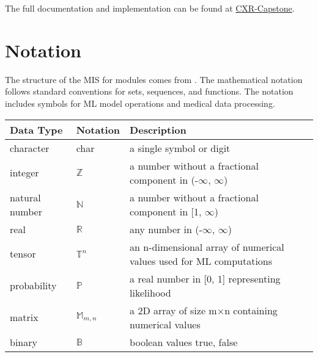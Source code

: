 \documentclass[12pt, titlepage]{article}
\begin{document}
The full documentation and implementation can be found at \href{https://github.com/RezaJodeiri/CXR-Capstone}{CXR-Capstone}.

\section{Notation}
The structure of the MIS for modules comes from \citet{HoffmanAndStrooper1995}. The mathematical notation follows standard conventions for sets, sequences, and functions. The notation includes symbols for ML model operations and medical data processing.
\begin{center}
    \renewcommand{\arraystretch}{1.2}
    \noindent 
    \begin{tabular}{l l p{7.5cm}} 
    \toprule 
    \textbf{Data Type} & \textbf{Notation} & \textbf{Description}\\ 
    \midrule
    character & char & a single symbol or digit\\
    integer & $\mathbb{Z}$ & a number without a fractional component in (-$\infty$, $\infty$)\\
    natural number & $\mathbb{N}$ & a number without a fractional component in [1, $\infty$)\\
    real & $\mathbb{R}$ & any number in (-$\infty$, $\infty$)\\
    tensor & $\mathbb{T}^{n}$ & an n-dimensional array of numerical values used for ML computations\\
    probability & $\mathbb{P}$ & a real number in [0, 1] representing likelihood\\
    matrix & $\mathbb{M}_{m,n}$ & a 2D array of size m×n containing numerical values\\
    binary & $\mathbb{B}$ & boolean values {true, false}\\
    \bottomrule
    \end{tabular} 
    \end{center}
\end{document}
